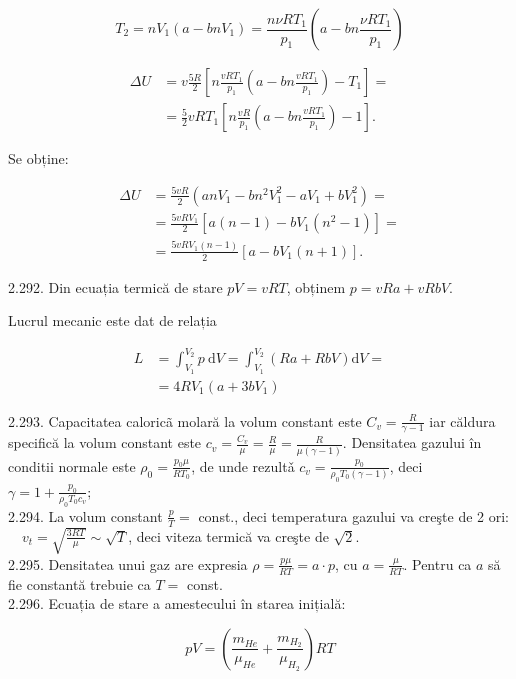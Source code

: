 \documentclass[10pt]{article}
\begin{document}
$$
T_{2}=n V_{1}\left(a-b n V_{1}\right)=\frac{n \nu R T_{1}}{p_{1}}\left(a-b n \frac{\nu R T_{1}}{p_{1}}\right)
$$

$$
\begin{aligned}
\Delta U & =v \frac{5 R}{2}\left[n \frac{v R T_{1}}{p_{1}}\left(a-b n \frac{v R T_{1}}{p_{1}}\right)-T_{1}\right]= \\
& =\frac{5}{2} v R T_{1}\left[n \frac{v R}{p_{1}}\left(a-b n \frac{v R T_{1}}{p_{1}}\right)-1\right] .
\end{aligned}
$$

Se obține:

$$
\begin{aligned}
\Delta U & =\frac{5 v R}{2}\left(a n V_{1}-b n^{2} V_{1}^{2}-a V_{1}+b V_{1}^{2}\right)= \\
& =\frac{5 v R V_{1}}{2}\left[a(n-1)-b V_{1}\left(n^{2}-1\right)\right]= \\
& =\frac{5 v R V_{1}(n-1)}{2}\left[a-b V_{1}(n+1)\right] .
\end{aligned}
$$

2.292. Din ecuația termică de stare $p V=v R T$, obținem $p=v R a+v R b V$.

Lucrul mecanic este dat de relația

$$
\begin{aligned}
L & =\int_{V_{1}}^{V_{2}} p \mathrm{~d} V=\int_{V_{1}}^{V_{2}}(R a+R b V) \mathrm{d} V= \\
& =4 R V_{1}\left(a+3 b V_{1}\right)
\end{aligned}
$$

2.293. Capacitatea caloricã molară la volum constant este $C_{v}=\frac{R}{\gamma-1}$ iar căldura specifică la volum constant este $c_{v}=\frac{C_{v}}{\mu}=\frac{R}{\mu}=\frac{R}{\mu(\gamma-1)}$. Densitatea gazului în conditii normale este $\rho_{0}=\frac{p_{0} \mu}{R T_{0}}$, de unde rezultǎ $c_{v}=\frac{p_{0}}{\rho_{0} T_{0}(\gamma-1)}$, deci $\gamma=1+\frac{p_{0}}{\rho_{0} T_{0} c_{v}} ;$\\
2.294. La volum constant $\frac{p}{T}=$ const., deci temperatura gazului va creşte de 2 ori: $\quad v_{t}=\sqrt{\frac{3 R T}{\mu}} \sim \sqrt{T}$, deci viteza termică va creşte de $\sqrt{2}$.\\
2.295. Densitatea unui gaz are expresia $\rho=\frac{p \mu}{R T}=a \cdot p$, cu $a=\frac{\mu}{R T}$. Pentru ca $a$ să fie constantă trebuie ca $T=$ const.\\
2.296. Ecuația de stare a amestecului în starea inițială:

$$
p V=\left(\frac{m_{H e}}{\mu_{H e}}+\frac{m_{H_{2}}}{\mu_{H_{2}}}\right) R T
$$
\end{document}
